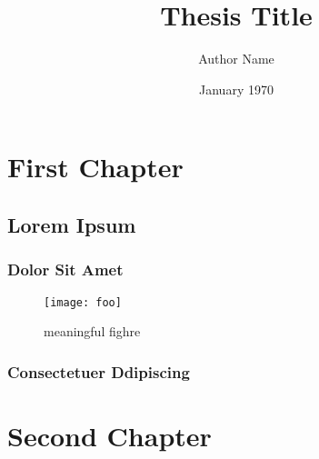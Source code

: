 \documentclass[masters,
    listoffigures,
    listoftables, 
    glossary, 
    withindex,
    final]{cu-thesis}
\title{Thesis Title}
\author{Author Name}
\date{January 1970}
\begin{document}
    \frontmatter

    \chapter{First Chapter}
    \lipsum[1]\layout

    \section*{Lorem Ipsum}
    \lipsum[3-5]

    \subsection*{Dolor Sit Amet}
    \lipsum[6-9]
    \begin{figure}
        \centering
        \texttt{[image: foo]}
        \caption[]{meaningful fighre}
    \end{figure}

    \subsection*{Consectetuer Ddipiscing}
    \lipsum[10-11]

    \chapter{Second Chapter}

    \appendix

    
    
\end{document}
